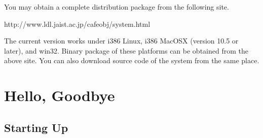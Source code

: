 \documentclass[a4paper]{memoir}
\begin{document}
You may obtain a complete distribution package from the
following site. 
\begin{vvtm}
\begin{ccode}
  http://www.ldl.jaist.ac.jp/cafeobj/system.html
\end{ccode}
\end{vvtm}

The current version works under i386 Linux, i386 MacOSX (version 10.5
or later), and win32. Binary package of these platforms can be
obtained from the above site. You can also download source code of the
system from the same place. 


\section{Hello, Goodbye}\label{sec:p2-startup}

\subsection{Starting Up}
\end{document}
